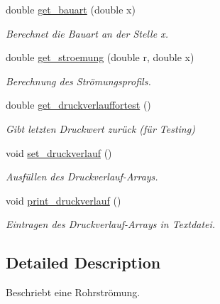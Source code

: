 \begin{DoxyCompactItemize}
\mbox{\label{class_rohrstroemung_a17fccbf71ba0dc1635e3a06fdc740cf3}} 
double \hyperlink{class_rohrstroemung_a17fccbf71ba0dc1635e3a06fdc740cf3}{get\+\_\+bauart} (double x)
\begin{DoxyCompactList}\small\item\em Berechnet die Bauart an der Stelle x. \end{DoxyCompactList}\item 
\mbox{\label{class_rohrstroemung_a1eae88254e88fbb314096c795ec2fac2}} 
double \hyperlink{class_rohrstroemung_a1eae88254e88fbb314096c795ec2fac2}{get\+\_\+stroemung} (double r, double x)
\begin{DoxyCompactList}\small\item\em Berechnung des Strömungsprofils. \end{DoxyCompactList}\item 
\mbox{\label{class_rohrstroemung_a1f0c06b0e89a1d8ffaf073038efdddd9}} 
double \hyperlink{class_rohrstroemung_a1f0c06b0e89a1d8ffaf073038efdddd9}{get\+\_\+druckverlauffortest} ()
\begin{DoxyCompactList}\small\item\em Gibt letzten Druckwert zurück (für Testing) \end{DoxyCompactList}\item 
\mbox{\label{class_rohrstroemung_ade5cf2d08a2c2c23d951d54ff2d05325}} 
void \hyperlink{class_rohrstroemung_ade5cf2d08a2c2c23d951d54ff2d05325}{set\+\_\+druckverlauf} ()
\begin{DoxyCompactList}\small\item\em Ausfüllen des Druckverlauf-\/\+Arrays. \end{DoxyCompactList}\item 
\mbox{\label{class_rohrstroemung_a3adc6cad22e5ab2132b3d82b7368ba8e}} 
void \hyperlink{class_rohrstroemung_a3adc6cad22e5ab2132b3d82b7368ba8e}{print\+\_\+druckverlauf} ()
\begin{DoxyCompactList}\small\item\em Eintragen des Druckverlauf-\/\+Arrays in Textdatei. \end{DoxyCompactList}\end{DoxyCompactItemize}


\subsection{Detailed Description}
Beschriebt eine Rohrströmung. 

